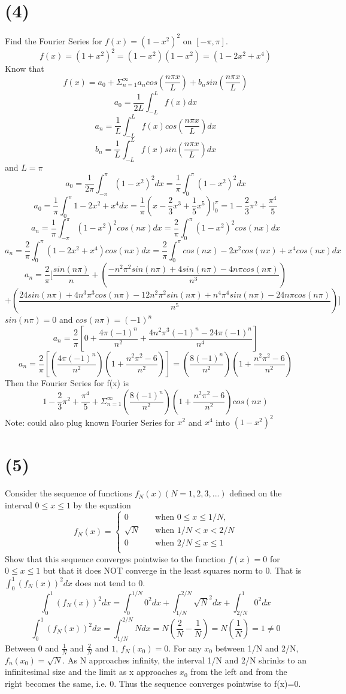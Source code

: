 \documentclass[preview,12pt]{article}
\begin{document}
\section*{(4)}
    Find the Fourier Series for $f(x)=(1-x^2)^2 $ on $[-\pi,\pi]$.  
    $$f(x)=(1+x^2)^2=(1-x^2)(1-x^2)=(1-2x^2+x^4)$$
    Know that 
    $$f(x)=a_0+\Sigma_{n=1}^\infty a_ncos(\frac{n \pi x}{L})+b_nsin(\frac{n \pi x}{L})$$
    $$a_0=\frac{1}{2L}\int_{-L}^Lf(x)dx$$
    $$a_n=\frac{1}{L}\int_{-L}^Lf(x)cos(\frac{n \pi x}{L})dx$$
    $$b_n=\frac{1}{L}\int_{-L}^Lf(x)sin(\frac{n \pi x}{L})dx$$
    and $L=\pi$
    $$a_0=\frac{1}{2\pi}\int_{-\pi}^\pi(1-x^2)^2dx=\frac{1}{\pi}\int_{0}^\pi(1-x^2)^2dx$$
    $$a_0=\frac{1}{\pi}\int_{0}^\pi1-2x^2+x^4dx=\frac{1}{\pi}(x-\frac{2}{3}x^3+\frac{1}{5}x^5)|_0^\pi=1-\frac{2}{3}\pi^2+\frac{\pi^4}{5}$$
    $$a_n=\frac{1}{\pi}\int_{-\pi}^\pi (1-x^2)^2cos(nx)dx=\frac{2}{\pi}\int_0^\pi(1-x^2)^2cos(nx)dx$$
    $$a_n=\frac{2}{\pi}\int_0^\pi(1-2x^2+x^4)cos(nx)dx=\frac{2}{\pi}\int_0^\pi cos(nx)-2x^2cos(nx)+x^4cos(nx)dx$$
    $$a_n=\frac{2}{\pi}[\frac{sin(n\pi)}{n}+\left(\frac{-n^2\pi^2sin(n\pi)+4sin(n\pi)-4n\pi cos(n\pi)}{n^3}\right)$$
    $$+\left(\frac{24sin(n\pi)+4n^3\pi^3cos(n\pi)-12n^2\pi^2sin(n\pi)+n^4\pi^4sin(n\pi)-24n\pi cos(n\pi)}{n^5}\right)]$$
    $sin(n\pi)=0$ and $cos(n\pi)=(-1)^n$
    $$a_n=\frac{2}{\pi}\left[0+\frac{4\pi(-1)^n}{n^2}+\frac{4n^2\pi^3(-1)^n-24\pi(-1)^n}{n^4}\right]$$
    $$a_n=\frac{2}{\pi}\left[\left(\frac{4\pi(-1)^n}{n^2}\right)\left(1+\frac{n^2\pi^2-6}{n^2}\right)\right]=\left(\frac{8(-1)^n}{n^2}\right)\left(1+\frac{n^2\pi^2-6}{n^2}\right)$$
    Then the Fourier Series for f(x) is
    $$1-\frac{2}{3}\pi^2+\frac{\pi^4}{5}+\Sigma_{n=1}^\infty \left(\frac{8(-1)^n}{n^2}\right)\left(1+\frac{n^2\pi^2-6}{n^2}\right)cos(nx)$$
    Note: could also plug known Fourier Series for $x^2$ and $x^4$ into $(1-x^2)^2$
    
\section*{(5)}
    Consider the sequence of functions $f_N(x)(N=1,2,3,...)$ defined on the interval $0\leq x \leq 1$ by the equation
    \[   
        f_N(x) = 
        \begin{cases}
         0 &\quad\text{when } 0 \leq x \leq 1/N, \\
         \sqrt{N} &\quad\text{when  } 1/N<x<2/N \\
         0 &\quad\text{when } 2/N\leq x \leq1 \\
        \end{cases}
    \]
    Show that this sequence converges pointwise to the function $f(x)=0$ for $0\leq x\leq1$ but that it does NOT converge in the least squares norm to 0.  That is $\int_0^1(f_N(x))^2dx$ does not tend to 0.
    $$\int_0^1(f_N(x))^2dx=\int_0^{1/N} 0^2 dx + \int_{1/N}^{2/N}\sqrt{N}^2dx+\int_{2/N}^1 0^2dx$$
    $$\int_0^1(f_N(x))^2dx=\int_{1/N}^{2/N}Ndx=N(\frac{2}{N}-\frac{1}{N})=N(\frac{1}{N})=1\neq 0$$
    Between $0$ and  $\frac{1}{N}$ and $\frac{2}{N}$ and $1$,  $f_N(x_0)=0$.  For any $x_0$ between 1/N and 2/N, $f_n(x_0)=\sqrt{N}$.  As N approaches infinity, the interval 1/N and 2/N shrinks to an infinitesimal size and the limit as x approaches $x_0$ from the left and from the right becomes the same, i.e. 0.  Thus the sequence converges pointwise to f(x)=0.
\end{document}
